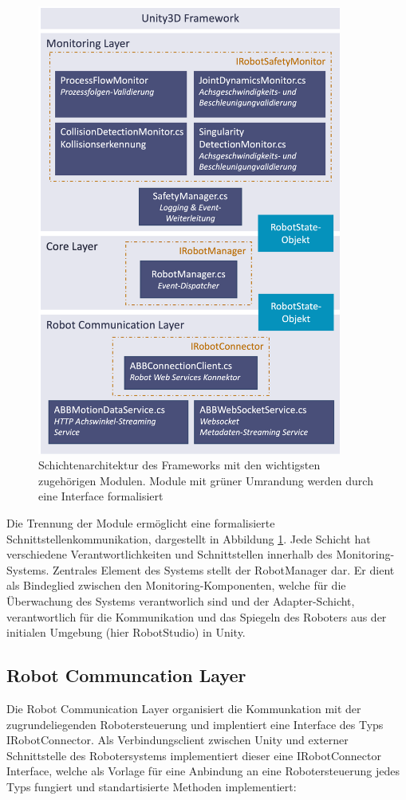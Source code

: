 \begin{figure}[H] \centering
	\includegraphics[width=10cm]{Figures/LayerArchitekturFramework.png}
	\caption{Schichtenarchitektur des Frameworks mit den wichtigsten zugehörigen
		Modulen. Module mit grüner Umrandung werden durch eine Interface formalisiert}
	\label{figure:layer}
\end{figure}

Die Trennung der Module ermöglicht eine formalisierte
Schnittstellenkommunikation, dargestellt in Abbildung \ref{figure:layer}.
Jede Schicht hat verschiedene Verantwortlichkeiten und Schnittstellen innerhalb
des Monitoring-Systems. Zentrales Element des Systems stellt der RobotManager
dar. Er dient als Bindeglied zwischen den Monitoring-Komponenten, welche für die
Überwachung des Systems verantworlich sind und der Adapter-Schicht,
verantwortlich für die Kommunikation und das Spiegeln des Roboters aus der
initialen Umgebung (hier RobotStudio) in Unity.

\subsection{Robot Communcation Layer}
Die Robot Communication Layer organisiert die Kommunkation mit der zugrundeliegenden Robotersteuerung und
implentiert eine Interface des Typs IRobotConnector. Als Verbindungsclient
zwischen Unity und externer Schnittstelle des Robotersystems implementiert
dieser eine IRobotConnector Interface, welche als Vorlage für eine Anbindung an
eine Robotersteuerung jedes Typs fungiert und standartisierte Methoden
implementiert:


